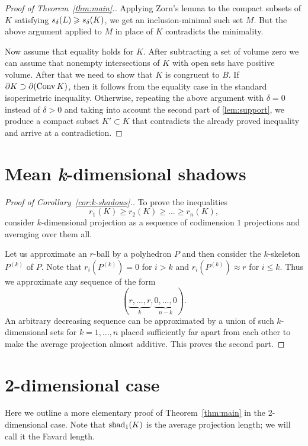 \documentclass[a4paper,10pt]{article}
\begin{document}
\begin{proof}[Proof of Theorem~\ref{thm:main}.]
Applying Zorn's lemma to the compact subsets of $K$ satisfying $s_\delta(L)\z\ge s_\delta(K)$, we get an inclusion-minimal such set $M$.
But the above argument applied to $M$ in place of $K$ contradicts the minimality.

Now assume that equality holds for $K$.
After subtracting a set of volume zero we can assume that nonempty intersections of $K$ with open sets have positive volume.
After that we need to show that $K$ is congruent to $B$.
If $\partial K\z\supset \partial(\conv K)$, then it follows from the equality case in the standard isoperimetric inequality.
Otherwise, repeating the above argument with $\delta=0$ instead of $\delta>0$ and taking into account the second part of \ref{lem:support}, we produce a compact subset $K'\subset K$ that contradicts the already proved inequality and arrive at a contradiction.
\end{proof}

\section{Mean \textit{k}-dimensional shadows}\label{sec:k-shadows}

\begin{proof}[Proof of Corollary~\ref{cor:k-shadows}.]
To prove the inequalities
\[
r_1(K)\ge r_2(K)\ge\dots\ge r_n(K),
\]
consider $k$-dimensional projection as a sequence of codimension $1$ projections and averaging over them all.

Let us approximate an $r$-ball by a polyhedron $P$ and then consider the $k$-skeleton $P^{(k)}$ of $P$.
Note that $r_i(P^{(k)})=0$ for $i>k$
and $r_i(P^{(k)})\approx r$ for $i\le k$.
Thus we approximate any sequence of the form
\[(\underbrace{r,\ldots,r}_k,\underbrace{0,\ldots,0}_{n-k}).\]
An arbitrary decreasing sequence can be approximated by a union of such $k$-dimensional sets for $k=1,\ldots,n$ placed sufficiently far apart from each other to make the average projection almost additive.
This proves the second part.
\end{proof}

\section{2-dimensional case}\label{sec:2D}

Here we outline a more elementary proof of Theorem~\ref{thm:main} in the 2-dimensional case.
Note that $\mathop{\rm shad}\nolimits_1(K)$ is the average projection length; we will call it the Favard length.
\end{document}
